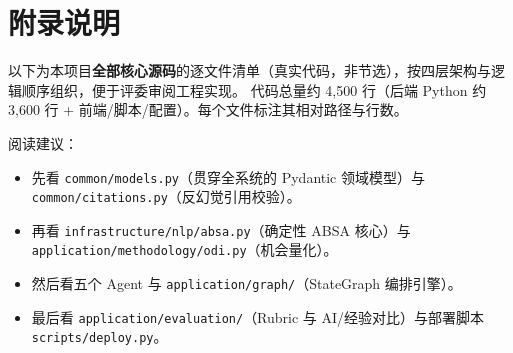 \section*{附录说明}

以下为本项目\textbf{全部核心源码}的逐文件清单（真实代码，非节选），按四层架构与逻辑顺序组织，便于评委审阅工程实现。
代码总量约 4{,}500 行（后端 Python 约 3{,}600 行 + 前端/脚本/配置）。每个文件标注其相对路径与行数。

\vspace{0.4cm}
\noindent 阅读建议：
\begin{itemize}
\item 先看 \texttt{common/models.py}（贯穿全系统的 Pydantic 领域模型）与 \texttt{common/citations.py}（反幻觉引用校验）。
\item 再看 \texttt{infrastructure/nlp/absa.py}（确定性 ABSA 核心）与 \texttt{application/methodology/odi.py}（机会量化）。
\item 然后看五个 Agent 与 \texttt{application/graph/}（StateGraph 编排引擎）。
\item 最后看 \texttt{application/evaluation/}（Rubric 与 AI/经验对比）与部署脚本 \texttt{scripts/deploy.py}。
\end{itemize}
\vspace{0.3cm}
